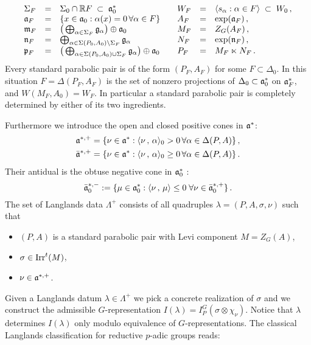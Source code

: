 \begin{equation}\label{eq:2.8}
\begin{array}{lll@{\qquad}lll}
\Sigma_F & = & \Sigma_0 \cap \mh R F \; \subset \; \mf a_0^* &
W_F & = & \langle s_\alpha : \alpha \in F \rangle \; \subset \; W_0 \,, \\
\mf a_F & = & \{ x \in \mf a_0 : \alpha (x) = 0 \, \forall
\alpha \in F \} & A_F & = & \exp (\mf a_F ) \,, \\
\mf m_F & = & \big( \bigoplus_{\alpha \in \Sigma_F} \mf g_\alpha
\big) \oplus \mf a_0 & M_F & = & Z_G (A_F ) \,, \\
\mf n_F & = & \bigoplus_{\alpha \in \Sigma (P_0 ,A_0 ) \setminus
\Sigma_F} \mf g_\alpha & N_F & = & \exp (\mf n_F ) \,, \\
\mf p_F & = & \big( \bigoplus_{\alpha \in \Sigma (P_0 ,A_0 ) \cup
\Sigma_F} \mf g_\alpha \big) \oplus \mf a_0 & P_F & = & M_F
\ltimes N_F \,.
\end{array}
\end{equation}
Every standard parabolic pair is of the form $(P_F ,A_F )$ for
some $F \subset \Delta_0$. In this situation $F = \Delta (P_F ,A_F )$ 
is the set of nonzero projections of $\Delta_0 \subset \mathfrak a_0^*$ on 
$\mathfrak a_F^*$, and $W(M_F ,A_0 ) = W_F$. In particular a standard parabolic 
pair is completely determined by either of its two ingredients.

Furthermore we introduce the open and closed positive cones in $\mathfrak a^*$:
\begin{align*}
& \mathfrak a^{*,+} = \{ \nu \in \mathfrak a^* : \langle \nu \,,\, \alpha \rangle_0 > 0
\,\forall \alpha \in \Delta (P,A) \} \,, \\
& \bar{\mathfrak a}^{*,+} = \{ \nu \in \mathfrak a^* : \langle \nu \,,\, \alpha \rangle_0 \geq
0 \,\forall \alpha \in \Delta (P,A) \} \,.
\end{align*}
Their antidual is the obtuse negative cone in $\mathfrak a_0^*$ : 
\[
\bar{\mathfrak a}_0^{*,-} := \{ \mu \in \mathfrak a_0^* : \langle \nu \,,\, \mu \rangle \leq 0 \; 
\forall \nu \in  \bar{\mathfrak a}_0^{*,+} \} \,.
\]
The set of Langlands data $\Lambda^+$ consists of all quadruples
$\lambda = (P,A,\sigma,\nu )$ such that
\begin{itemize}
\item $(P,A)$ is a standard parabolic pair with Levi component $M
= Z_G (A) $,
\item $\sigma \in \mathrm{Irr}^t (M) $,
\item $\nu \in \mathfrak a^{*,+} $.
\end{itemize}
Given a Langlands datum $\lambda \in \Lambda^+$ we pick a concrete realization of
$\sigma$ and we construct the admissible $G$-representation 
$I (\lambda ) = I_P^G (\sigma \otimes \chi_\nu )$. Notice that $\lambda$ determines
$I(\lambda )$ only modulo equivalence of $G$-representations. 
The classical Langlands classification for reductive $p$-adic groups reads:

